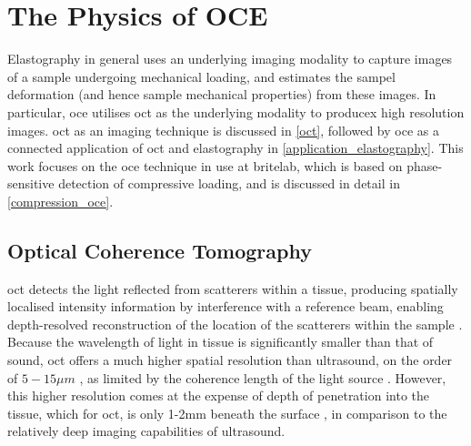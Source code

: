 \chapter{The Physics of OCE}\label{oce}

Elastography in general uses an underlying imaging modality to capture images of a sample undergoing mechanical loading, and estimates the sampel deformation (and hence sample mechanical properties) from these images. In particular, \ac{oce} utilises \ac{oct} as the underlying modality to producex high resolution images. \ac{oct} as an imaging technique is discussed in \autoref{oct}, followed by \ac{oce} as a connected application of \ac{oct} and elastography in \autoref{application_elastography}. 
This work focuses on the \ac{oce} technique in use at \ac{britelab}, which is based on phase-sensitive detection of compressive loading, and is discussed in detail in \autoref{compression_oce}.

\section{Optical Coherence Tomography}\label{oct}
\ac{oct} detects the light reflected from scatterers within a tissue, producing spatially localised intensity information by interference with a reference beam, enabling depth-resolved reconstruction of the location of the scatterers within the sample \cite{chin_parametric_2016}. Because the wavelength of light in tissue is significantly smaller than that of sound, \ac{oct} offers a much higher spatial resolution than ultrasound, on the order of $5-15 \mu m$ \cite{kennedy_emergence_2017}, as limited by the coherence length of the light source \cite{huang_optical_1991}. However, this higher resolution comes at the expense of depth of penetration into the tissue, which for \ac{oct}, is only 1-2mm beneath the surface \cite{schmitt_optical_1999}, in comparison to the relatively deep imaging capabilities of ultrasound.


